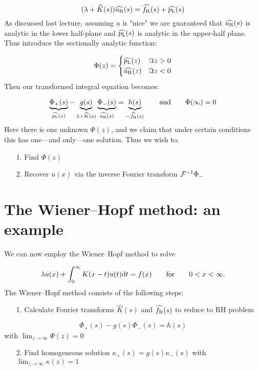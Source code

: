 \documentclass[12pt,landscape]{article}
\def\qqand{\qquad\hbox{and}\qquad}
\def\qqfor{\qquad\hbox{for}\qquad}
\def\D{ {\rm d} }
\def\dt{\D t}
\def\endash{–}
\def\emdash{—}
\begin{document}
{\[
(\lambda + \widehat K(s)) \widehat{u_{\rm R}}(s) = \widehat{f_{\rm R}}(s) + \widehat{p_{\rm L}}(s)
\]
As discussed last lecture, assuming $u$ is "nice" we are guaranteed that $\widehat{ u_{\rm R}}(s)$ is analytic in the lower half-plane and $\widehat{ p_{\rm L}}(s)$ is analytic in the upper-half plane. Thus introduce the sectionally analytic function:

\[
\Phi(z) = \begin{cases}  \widehat{p_{\rm L}}(z) & \Im z > 0 \\
                            \widehat{u_{\rm R}}(z) & \Im z < 0
                            \end{cases}
\]
Then our transformed integral equation becomes:

\[
\underbrace{\Phi_+(s)}_{\widehat{p_{\rm L}}(s)} - \underbrace{g(s)}_{\lambda + \widehat K(s)} \underbrace{\Phi_-(s)}_{\widehat{u_{\rm R}}(s)} = \underbrace{h(s)}_{-\widehat{f_{\rm R}}(s) } \qqand \Phi(\infty) = 0
\]
Here there is one unknown $\Phi(z)$, and we claim that under certain conditions this has one\ensuremath{\emdash}and only\ensuremath{\emdash}one solution. Thus we wish to:

\begin{itemize}
\item[1. ] Find $\Phi(z)$


\item[2. ] Recover $u(x)$ via the inverse Fourier transform ${\cal F}^{-1} \Phi_-$

\end{itemize}
\newpage
\section{The Wiener\ensuremath{\endash}Hopf method: an example}
We can now employ the Wiener\ensuremath{\endash}Hopf method to solve

\[
\lambda u(x) + \int_{0}^\infty K(x-t)u(t) \dt = f(x)\qqfor 0 < x < \infty.
\]
The Wiener\ensuremath{\endash}Hopf method consists of the following steps:

\begin{itemize}
\item[1. ] Calculate Fourier transforms $\widehat K(s)$ and $\widehat{f_{\rm R}}(s)$ to reduce to RH problem

\end{itemize}
\[
\Phi_+(s) -g(s) \Phi_-(s) = h(s)
\]
with $\lim_{z \to \infty} \Phi(z) = 0$

\begin{itemize}
\item[2. ] Find homogeneous solution $\kappa_+(s) = g(s) \kappa_-(s)$ with $\lim_{z \to \infty} \kappa(z) = 1$



\end{itemize}}
\end{document}

